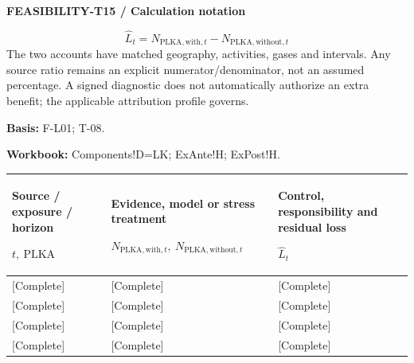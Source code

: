 \par\begingroup\sffamily\fontsize{8}{10}\selectfont\color{NEBGreen}\setlength{\parskip}{2pt}\setlength{\abovedisplayskip}{4pt}\setlength{\belowdisplayskip}{4pt}\setlength{\abovedisplayshortskip}{2pt}\setlength{\belowdisplayshortskip}{3pt}
\textbf{FEASIBILITY-T15 / Calculation notation}\par
{\fontsize{9}{11}\selectfont\[ \widehat L_t=N_{\mathrm{PLKA,with},t}-N_{\mathrm{PLKA,without},t} \]}
The two accounts have matched geography, activities, gases and intervals. Any source ratio remains an explicit numerator/denominator, not an assumed percentage. A signed diagnostic does not automatically authorize an extra benefit; the applicable attribution profile governs.\par
\textbf{Basis:} F-L01; T-08.\par
\textbf{Workbook:} Components!D=LK; ExAnte!H; ExPost!H.\par\endgroup
{\sffamily\fontsize{8.3}{10.3}\selectfont\begin{longtable}{@{}P{51.14mm} P{57.74mm} P{56.09mm}@{}}
\toprule
\textbf{Source / exposure / horizon}\par {\normalfont\fontsize{8.2}{10}\selectfont $t,\ \mathrm{PLKA}$} & \textbf{Evidence, model or stress treatment}\par {\normalfont\fontsize{8.2}{10}\selectfont $N_{\mathrm{PLKA,with},t},\ N_{\mathrm{PLKA,without},t}$} & \textbf{Control, responsibility and residual loss}\par {\normalfont\fontsize{8.2}{10}\selectfont $\widehat L_t$}\\\midrule\endhead
\rule{0pt}{7.7mm}[Complete] & [Complete] & [Complete]\\\hline
\rule{0pt}{7.7mm}[Complete] & [Complete] & [Complete]\\\hline
\rule{0pt}{7.7mm}[Complete] & [Complete] & [Complete]\\\hline
\rule{0pt}{7.7mm}[Complete] & [Complete] & [Complete]\\\hline
\end{longtable}}
